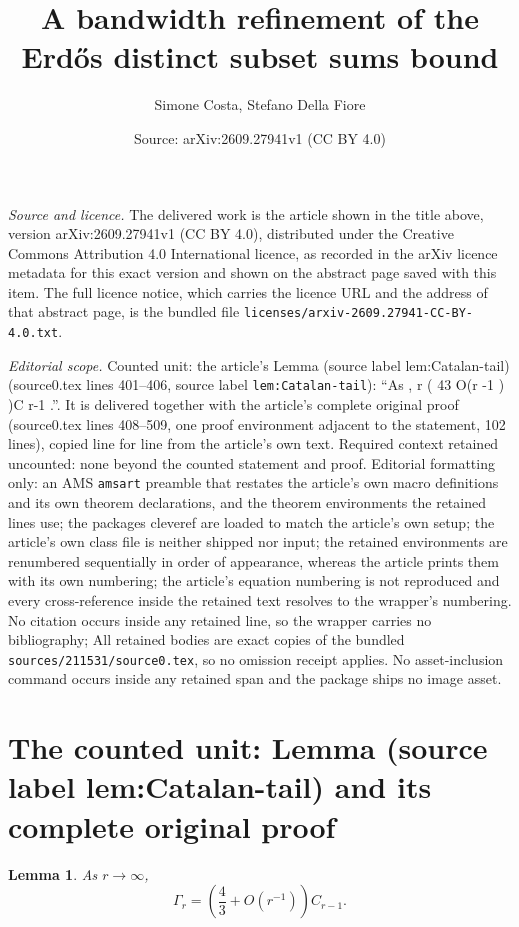 \documentclass[10pt,a4paper]{amsart}
\title[A bandwidth refinement of the Erd\H{o}s distinct subset sums bound]{A bandwidth refinement of the Erd\H{o}s distinct subset sums bound}
\author{Simone Costa, Stefano Della Fiore}
\date{Source: arXiv:2609.27941v1 (CC BY 4.0)}
\theoremstyle{plain}
\newtheorem{lemma}[theorem]{Lemma}
\begin{document}
\maketitle

\noindent\emph{Source and licence.} The delivered work is the article shown in the title above, version arXiv:2609.27941v1 (CC BY 4.0), distributed under the Creative Commons Attribution 4.0 International licence, as recorded in the arXiv licence metadata for this exact version and shown on the abstract page saved with this item. The full licence notice, which carries the licence URL and the address of that abstract page, is the bundled file \texttt{licenses/arxiv-2609.27941-CC-BY-4.0.txt}.
\par\smallskip

\noindent\textit{Editorial scope.} Counted unit: the article's Lemma (source label lem:Catalan-tail) (source0.tex lines 401--406, source label \texttt{lem:Catalan-tail}): ``As , r ( 43 O(r -1 ) )C r-1 .''. It is delivered together with the article's complete original proof (source0.tex lines 408--509, one proof environment adjacent to the statement, 102 lines), copied line for line from the article's own text. Required context retained uncounted: none beyond the counted statement and proof. Editorial formatting only: an AMS \texttt{amsart} preamble that restates the article's own macro definitions and its own theorem declarations, and the theorem environments the retained lines use; the packages cleveref are loaded to match the article's own setup; the article's own class file is neither shipped nor input; the retained environments are renumbered sequentially in order of appearance, whereas the article prints them with its own numbering; the article's equation numbering is not reproduced and every cross-reference inside the retained text resolves to the wrapper's numbering. No citation occurs inside any retained line, so the wrapper carries no bibliography; All retained bodies are exact copies of the bundled \texttt{sources/211531/source0.tex}, so no omission receipt applies. No asset-inclusion command occurs inside any retained span and the package ships no image asset.


\section{The counted unit: Lemma (source label lem:Catalan-tail) and its complete original proof}

\begin{lemma}\label{lem:Catalan-tail}
As $r\to\infty$,
\begin{equation}\label{eq:Catalan-tail}
 \Gamma_r=\left(\frac43+O(r^{-1})\right)C_{r-1}.
\end{equation}
\end{lemma}
\end{document}
